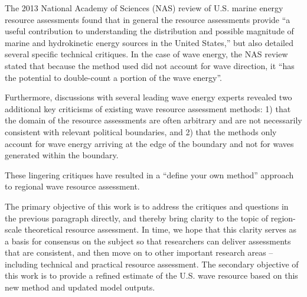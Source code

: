 The 2013 National Academy of Sciences (NAS) review of U.S. marine energy resource assessments found that in general the resource assessments provide “a useful contribution to understanding the distribution and possible magnitude of marine and hydrokinetic energy sources in the United States,” but also detailed several specific technical critiques. In the case of wave energy, the NAS review stated that because the method used did not account for wave direction, it “has the potential to double-count a portion of the wave energy”. 

Furthermore, discussions with several leading wave energy experts revealed two additional key criticisms of existing wave resource assessment methods: 1) that the domain of the resource assessments are often arbitrary and are not necessarily consistent with relevant political boundaries, and 2) that the methods only account for wave energy arriving at the edge of the boundary and not for waves generated within the boundary.

These lingering critiques have resulted in a “define your own method” approach to regional wave resource assessment. 

The primary objective of this work is to address the critiques and questions in the previous paragraph directly, and thereby bring clarity to the topic of region-scale theoretical resource assessment. In time, we hope that this clarity serves as a basis for consensus on the subject so that researchers can deliver assessments that are consistent, and then move on to other important research areas – including technical and practical resource assessment. The secondary objective of this work is to provide a refined estimate of the U.S. wave resource based on this new method and updated model outputs.

